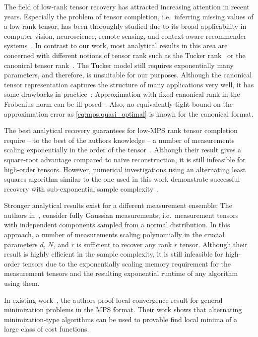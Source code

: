 The field of low-rank tensor recovery has attracted increasing attention in recent years.
Especially the problem of tensor completion, i.e.\ inferring missing values of a low-rank tensor, has been thoroughly studied due to its broad applicability in computer vision, neuroscience, remote sensing, and context-aware recommender systems~\cite{Li_2010_Tensor,Zhu_2016_ContextAware,Wang_2014_LowRank}.
In contrast to our work, most analytical results in this area are concerned with different notions of tensor rank such as the Tucker rank~\cite{Kressner_2013_LowRank,Zhang_2016_Cross} or the canonical tensor rank~\cite{Krishnamurthy_2013_LowRank,Potechin_2017_Exact,Ghadermarzy_2017_NearOptimal}.
The Tucker model still requires exponentially many parameters, and therefore, is unsuitable for our purposes.
Although the canonical tensor representation captures the structure of many applications very well, it has some drawbacks in practice~\cite{Kolda_2009_Tensor}:
Approximation with fixed canonical rank in the Frobenius norm can be ill-posed~\cite{Silva_2008_Tensor}.
Also, no equivalently tight bound on the approximation error as \cref{eq:mps.quasi_optimal} is known for the canonical format.

The best analytical recovery guarantees for low-MPS rank tensor completion require -- to the best of the authors knowledge -- a number of measurements scaling exponentially in the order of the tensor~\cite{Phien_2016_Efficient}.
Although their result gives a square-root advantage compared to na\"ive reconstruction, it is still infeasible for high-order tensors.
However, numerical investigations using an alternating least squares algorithm similar to the one used in this work demonstrate successful recovery with sub-exponential sample complexity~\cite{Grasedyck_2015_Variants,Wang_2016_Tensor}.

Stronger analytical results exist for a different measurement ensemble:
The authors in~\cite{Rauhut_2014_Tensor,Rauhut_2016_Low}, consider fully Gaussian measurements, i.e.\ measurement tensors with independent components sampled from a normal distribution.
In this approach, a number of measurements scaling polynomially in the crucial parameters $d$, $N$, and $r$ is sufficient to recover any rank $r$ tensor.
Although their result is highly efficient in the sample complexity, it is still infeasible for high-order tensors due to the exponentially scaling memory requirement for the measurement tensors and the resulting exponential runtime of any algorithm using them.

In existing work~\cite{Holtz_2012_Alternating,Rohwedder_2013_On}, the authors proof local convergence result for general minimization problems in the MPS format.
Their work shows that alternating minimization-type algorithms can be used to provable find local minima of a large class of cost functions.

